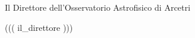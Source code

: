 \begin{flushright}
\begin{minipage}[c]{6cm}
\begin{center}
Il Direttore dell'Osservatorio Astrofisico di Arcetri

((( il_direttore )))

\end{center}
\end{minipage}
\end{flushright}

